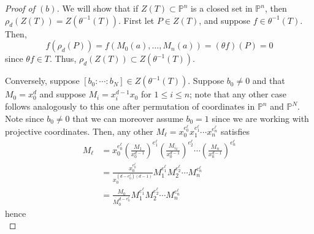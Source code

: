 \documentclass[12pt,letterpaper]{article}
\theoremstyle{definition}
\theoremstyle{remark}
\numberwithin{equation}{section}
\numberwithin{figure}{problem}
\let\Im\relax
\DeclareMathOperator{\Im}{im}
\newcommand{\PP}{\mathbb{P}}
\begin{document}
\begin{proof}[Proof of $(b)$]
  We will show that if $Z(T) \subset \PP^n$ is a closed set in $\PP^n$, then
  $\rho_d(Z(T)) = Z(\theta^{-1}(T))$. First let $P \in Z(T)$, and
  suppose $f \in \theta^{-1}(T)$. Then,
  \begin{equation*}
    f(\rho_d(P)) = f(M_0(a),\ldots,M_n(a)) = (\theta f)(P) = 0
  \end{equation*}
  since $\theta f \in T$. Thus, $\rho_d(Z(T)) \subset Z(\theta^{-1}(T))$.
  \par Conversely, suppose $[b_0:\cdots:b_N] \in Z(\theta^{-1}(T))$.
  Suppose $b_0 \ne 0$ and that $M_0 = x_0^d$ and suppose $M_i = x_i^{d-1}x_0$
  for $1 \le i \le n$; note that any other case follows analogously to
  this one after permutation of coordinates in $\PP^n$ and $\PP^N$.
  Note since $b_0 \ne 0$ that we can moreover assume $b_0 = 1$ since we are
  working with projective coordinates.
  Then, any other $M_\ell = x_0^{e^\ell_0}x_1^{e^\ell_1}\cdots
  x_n^{e^\ell_n}$ satisfies
  \begin{align*}
    M_\ell &= x_0^{e^\ell_0} \left(\frac{M_1}{x_0^{d-1}}\right)^{e^\ell_1}
    \left(\frac{M_{i_2}}{x_0^{d-1}}\right)^{e^\ell_2} \cdots
    \left(\frac{M_n}{x_0^{d-1}}\right)^{e^\ell_n}\\
    &= \frac{x_0^{e^\ell_0}}{x_0^{(d-e^\ell_0)(d-1)}}M_1^{e^\ell_1}M_2^{e^\ell_2}
    \cdots M_n^{e^\ell_n}\\
    &= \frac{M_0}{M_0^{d-e^\ell_0}} M_1^{e^\ell_1}M_2^{e^\ell_2}\cdots M_n^{e^\ell_n}
  \end{align*}
  hence
  \begin{equation*}

\end{equation*}
\end{proof}
\end{document}
